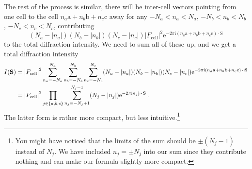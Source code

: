 \documentclass{article}
\theoremstyle{plain}\theoremheaderfont{\normalfont\itshape}\theorembodyfont{\rmfamily}\theoremseparator{.}\newtheorem*{rem}{Remark}\newtheorem*{ex}{Example}\newtheorem*{proof}{Proof}\newtheorem*{altp}{Alternative proof}
\theoremstyle{plain}\theoremheaderfont{\normalfont\bfseries}\theorembodyfont{\rmfamily}\theoremseparator{.}\newtheorem{thm}{Theorem}[section]\newtheorem{lem}[thm]{Lemma}\newtheorem{prop}[thm]{Proposition}\newtheorem*{cor}{Corollary}\newtheorem{defn}[thm]{Definition}\newtheorem{clm}[thm]{Claim}\newtheorem{clminproof}{Claim}\newtheorem*{law}{Law}\newtheorem{pos}[thm]{Postulate}
\theoremstyle{break}\theoremheaderfont{\normalfont\itshape}\theorembodyfont{\rmfamily}\theoremseparator{.\medskip}\newtheorem*{proofskip}{Proof}\newtheorem*{exs}{Examples}\newtheorem*{rems}{Remarks}
\theoremstyle{break}\theoremheaderfont{\normalfont\bfseries}\theorembodyfont{\rmfamily}\theoremseparator{.\medskip}\newtheorem{lemskip}[thm]{Lemma}\newtheorem{defnskip}[thm]{Definition}\newtheorem{propskip}[thm]{Proposition}\newtheorem{thmskip}[thm]{Theorem}
\numberwithin{equation}{section}
\newcommand{\ii}{\mathrm{i}}
\newcommand{\ee}{\mathrm{e}}
\newcommand{\vb}[1]{\bm{\mathrm{#1}}}
\newcommand{\vdot}{\,\bm{\mathrm{\cdot}}\,}
\newcommand{\abs}[1]{\left| #1 \right|}
\begin{document}
    The rest of the process is similar, there will be inter-cell vectors pointing from one cell to the cell \(n_a\vb{a}+n_b\vb{b}+n_c\vb{c}\) away for any \(-N_a< n_a< N_a\), \(-N_b< n_b< N_b\), \(-N_c< n_c< N_c\), contributing
    \begin{equation}
        (N_a-\abs{n_a})(N_b-\abs{n_b})(N_c-\abs{n_c})\abs{F_{\text{cell}}}^2 \ee^{-2\pi \ii(n_a\vb{a}+n_b\vb{b}+n_c\vb{c})\vdot\vb{S}}
    \end{equation}
    to the total diffraction intensity. We need to sum all of these up, and we get a total diffraction intensity
    \begin{align}
        I(\vb{S})&=\abs{F_{\text{cell}}}^2\sum_{n_a=-N_a}^{N_a}\sum_{n_b=-N_b}^{N_b}\sum_{n_c=-N_c}^{N_c}(N_a-\abs{n_a})(N_b-\abs{n_b})(N_c-\abs{n_c})\ee^{-2\pi \ii(n_a\vb{a}+n_b\vb{b}+n_c\vb{c})\vdot\vb{S}}\notag \\
        &=\abs{F_{\text{cell}}}^2\prod_{j\in\{a,b,c\}}\sum_{n_j=-N_j+1}^{N_j-1}(N_j-\abs{n_j})\ee^{-2\pi \ii n_j\vb{j}\vdot\vb{S}}\,.
    \end{align}
    The latter form is rather more compact, but less intuitive.\footnote{You might have noticed that the limits of the sum should be \(\pm(N_j-1)\) instead of \(N_j\). We have included \(n_j=\pm N_j\) into our sum since they contribute nothing and can make our formula slightly more compact.}
\end{document}
